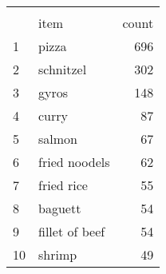 \begin{tabular}{llr}
\\[-1.8ex]\hline
\hline \\[-1.8ex]
{} &                                               item &  count \\
\midrule
1    &                                              pizza &    696 \\
2    &                                          schnitzel &    302 \\
3    &                                              gyros &    148 \\
4    &                                              curry &     87 \\
5    &                                             salmon &     67 \\
6    &                                      fried noodels &     62 \\
7    &                                         fried rice &     55 \\
8    &                                            baguett &     54 \\
9    &                                     fillet of beef &     54 \\
10   &                                             shrimp &     49 \\
\bottomrule
\end{tabular}
